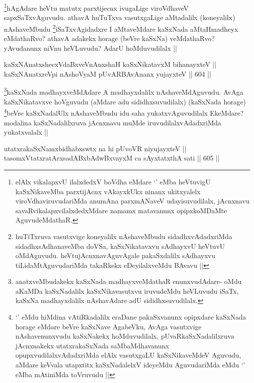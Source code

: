 \begin{artha}
\footnote{elAlx vikalapxvU ilalxdedxV boVdha eMdare `\stext' eMba heVtuvigU kaSxNikaveMba parxtijAcnx vAkayxkUkx ninanx ukitxyalelx viroVdhaviruvudariMda anumAna parxmANaveV udayisuvudilalx, jAcnxnavu savaRvikalapxvilalxdedxMdare namamx matavanunx opipxkoMDaMte AguvudeMdathaR.}hAgAdare heVtu matutx parxtijecnx ivugaLige viroVdhaveV sapxSaTxvAguvudu. athavA huTuTxva vasutxgaLige aMtadalilx (koneyalilx) nAshaveMbudu \footnote{huTiTxruva vasutxvige koneyalilx nAshaveMbudu sidadhxvAdadxriMda sidadhxsAdhanaveMba doVSa, kaSxNikatavxvu sAdhayxvU heVtuvU oMdAguvudu. heVtujAcnxnavAguvAgale pakaSxdalilx sAdhayxvu tiLidaMtAguvudariMda takaRkekx eDeyilalxveMdu BAvavu ||}iSaTxvAgidadxre I aMtaveMdare kaSxNada aMtaHmadheyx eMdathaRvo? athavA adakekx horage (beVre kaSxNa) veMdathaRvo? yAvudanunx niVnu heVLuvudu? AdarU hoMduvudilalx ||
\end{artha}


\begin{shl}
kaSxNAnatxshecxVdaBxveVnAnxshaH kaSxNikatavxM bihanayxteV || \\
kaSxNAnatxreV\s pi nAshoV\s yaM pUvARBAvAnanx yujayxteV ||  604 ||  
\end{shl}

\begin{artha}
\footnote{anatxveMbudakekx kaSxNada madhayxveMdathaR enunxvudAdare- oMdu aKaMDa kaSxNadalilx kaSxNikavasutxvu iruvudeMdu heVLuvudu iSaTx, kaSxNa madhayxdalilx nAshavAdare adU sididhxsuvudilalx.}kaSxNada madhayxveMdAdare A madhayxdalilx nAshaveMdAguvudu. AvAga kaSxNikatavxve hoVguvudu (aMdare adu sididhxsuvudilalx) (kaSxNada horage) \footnote{`\stext' eMdu hiMdina vAtiRkadalilx eraDane pakaSxvanunx opipxdare kaSxNada horage eMdare beVre kaSxNave AgabeVku, AvAga vasutxvige nAshavenunxvudu kaSxNakekx hoMduvudilalx, pUvaRkaSxNadalilxruva jAcnxnakekx utatxrakaSxNada saMbaMdhavanunx opupxvudilalxvAdadxriMda elAlx vasutxgaLU kaSxNikaveMdeV Aguvudu, aMdare keVvala utapxtitx kaSxNadalelxV ideyeMdu AguvudariMda eMdu `\stext' eMba mAtiniMda toVruvudu ||}beVre kaSxNadalUlx nAshaveMbudu idu saha yukatxvAguvudilalx EkeMdare? modalina kaSxNadalilxruva jAcnxnavu muMde iruvudilalxvAdadxriMda yukatxvalalx ||
\end{artha}


\begin{shl}
utatxrakaSxNamxbidhabxswtx na hi pUvoVR niyujayxteV || \\
tasomxVtatxratArxsadABxbAdwBxvayxM ca sAyxtatxthA sati ||  605 ||  
\end{shl}

